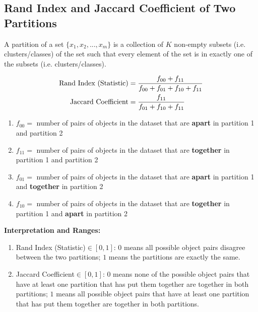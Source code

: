 \documentclass[11pt]{elegantbook}
\begin{document}
\subsection{Rand Index and Jaccard Coefficient of Two Partitions}
A partition of a set $\{x_1, x_2, ... , x_m\}$ is a collection of $K$ non-empty subsets (i.e. clusters/classes) of the set such that every element of the set is in exactly one of the subsets (i.e. clusters/classes).
\begin{definition}
    \begin{equation}
        \begin{aligned}
            \textnormal{Rand Index (Statistic)}&=\frac{f_{00}+f_{11}}{f_{00}+f_{01}+f_{10}+f_{11}}\\
            \textnormal{Jaccard Coefficient}&=\frac{f_{11}}{f_{01}+f_{10}+f_{11}}\\
        \end{aligned}
        \nonumber
    \end{equation}
    \begin{enumerate}[$\circ$]
        \item $f_{00}=$ number of pairs of objects in the dataset that are \textbf{apart} in partition 1 and partition 2
        \item $f_{11}=$ number of pairs of objects in the dataset that are \textbf{together} in partition 1 and partition 2
        \item $f_{01}=$ number of pairs of objects in the dataset that are \textbf{apart} in partition 1 and \textbf{together} in partition 2
        \item $f_{10}=$ number of pairs of objects in the dataset that are \textbf{together} in partition 1 and \textbf{apart} in partition 2
    \end{enumerate}
\end{definition}
\textbf{Interpretation and Ranges:}
\begin{enumerate}
    \item Rand Index (Statistic)$\in [0,1]$: $0$ means all possible object pairs disagree between the two partitions; $1$ means the partitions are exactly the same.
    \item Jaccard Coefficient$\in [0,1]$: $0$ means none of the possible object pairs that have
    at least one partition
    that has put them
    together are together in both partitions; $1$ means all possible object pairs that have at least one partition that has put them together are together in both partitions.
\end{enumerate}
\end{document}
